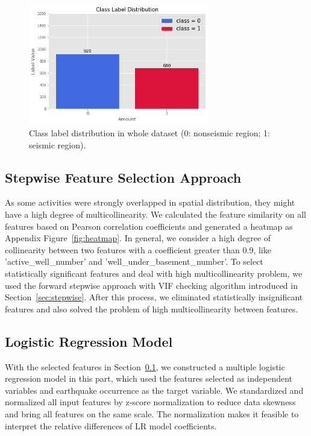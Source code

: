 \documentclass[final-report]{report-template}
\begin{document}
\begin{figure}
    \begin{center}
        \includegraphics[width=0.7\textwidth]{class_label.png}
    \end{center}
    \caption{\label{fig:class_label} Class label distribution in whole dataset (0: nonseismic region; 1: seismic region).}
\end{figure}

\subsection{Stepwise Feature Selection Approach}
\label{sec:SFSA}
As some activities were strongly overlapped in spatial distribution, they might have a high degree of multicollinearity. 
We calculated the feature similarity on all features based on Pearson \citep{benesty2009pearson} correlation coefficients and generated a heatmap as Appendix Figure~\ref{fig:heatmap}.
In general, we consider a high degree of collinearity between two features with a coefficient greater than 0.9, like 'active\_well\_number' and 'well\_under\_basement\_number'.
To select statistically significant features and deal with high multicollinearity problem, we used the forward stepwise approach with VIF checking algorithm introduced in Section~\ref{sec:stepwise}. 
After this process, we eliminated statistically insignificant features and also solved the problem of high multicollinearity between features. 

\subsection{Logistic Regression Model}
\label{sec:LRM}
With the selected features in Section~\ref{sec:SFSA}, we constructed a multiple logistic regression model in this part, which used the features selected as independent variables and earthquake occurrence as the target variable.
We standardized and normalized all input features by z-score normalization \citep{patro2015normalization} to reduce data skewness and bring all features on the same scale. 
The normalization makes it feasible to interpret the relative differences of LR model coefficients.
\end{document}

